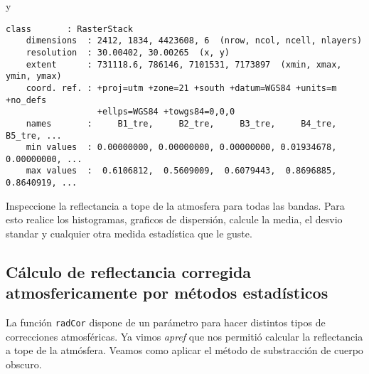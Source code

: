 \begin{exa}
    y

    \begin{Verbatim}[fontsize=\small]
    class       : RasterStack
    dimensions  : 2412, 1834, 4423608, 6  (nrow, ncol, ncell, nlayers)
    resolution  : 30.00402, 30.00265  (x, y)
    extent      : 731118.6, 786146, 7101531, 7173897  (xmin, xmax, ymin, ymax)
    coord. ref. : +proj=utm +zone=21 +south +datum=WGS84 +units=m +no_defs
                  +ellps=WGS84 +towgs84=0,0,0
    names       :     B1_tre,     B2_tre,     B3_tre,     B4_tre,     B5_tre, ...
    min values  : 0.00000000, 0.00000000, 0.00000000, 0.01934678, 0.00000000, ...
    max values  :  0.6106812,  0.5609009,  0.6079443,  0.8696885,  0.8640919, ...
    \end{Verbatim}

    \end{exa}

\begin{act}
    Inspeccione la reflectancia a tope de la atmosfera para todas las bandas.
    Para esto realice los histogramas, graficos de dispersi\'on, calcule la media,
    el desvio standar y cualquier otra medida estad\'istica que le guste.
\end{act}
\subsection{C\'alculo de reflectancia corregida atmosfericamente por m\'etodos
            estad\'isticos}

La funci\'on \texttt{radCor} dispone de un par\'ametro para hacer distintos
tipos de correcciones atmosf\'ericas. Ya vimos \emph{apref} que nos permiti\'o
calcular la reflectancia a tope de la atm\'osfera. Veamos como aplicar el m\'etodo
de substracci\'on de cuerpo obscuro.

